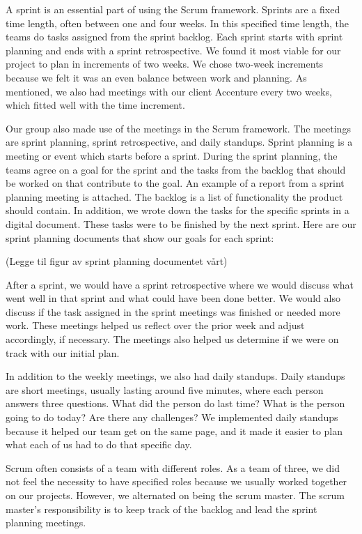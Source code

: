 A sprint is an essential part of using the Scrum framework. Sprints are a fixed time length, often between one and four weeks. In this specified time length, the teams do tasks assigned from the sprint backlog. Each sprint starts with sprint planning and ends with a sprint retrospective. We found it most viable for our project to plan in increments of two weeks. We chose two-week increments because we felt it was an even balance between work and planning. As mentioned, we also had meetings with our client Accenture every two weeks, which fitted well with the time increment.   

Our group also made use of the meetings in the Scrum framework. The meetings are sprint planning, sprint retrospective, and daily standups. Sprint planning is a meeting or event which starts before a sprint. During the sprint planning, the teams agree on a goal for the sprint and the tasks from the backlog that should be worked on that contribute to the goal. An example of a report from a sprint planning meeting is attached. The backlog is a list of functionality the product should contain. In addition, we wrote down the tasks for the specific sprints in a digital document. These tasks were to be finished by the next sprint. Here are our sprint planning documents that show our goals for each sprint:

(Legge til figur av sprint planning documentet vårt)

After a sprint, we would have a sprint retrospective where we would discuss what went well in that sprint and what could have been done better. We would also discuss if the task assigned in the sprint meetings was finished or needed more work. These meetings helped us reflect over the prior week and adjust accordingly, if necessary. The meetings also helped us determine if we were on track with our initial plan. 
 
In addition to the weekly meetings, we also had daily standups. Daily standups are short meetings, usually lasting around five minutes, where each person answers three questions. What did the person do last time? What is the person going to do today? Are there any challenges? We implemented daily standups because it helped our team get on the same page, and it made it easier to plan what each of us had to do that specific day.

Scrum often consists of a team with different roles. As a team of three, we did not feel the necessity to have specified roles because we usually worked together on our projects. However, we alternated on being the scrum master. The scrum master's responsibility is to keep track of the backlog and lead the sprint planning meetings.

